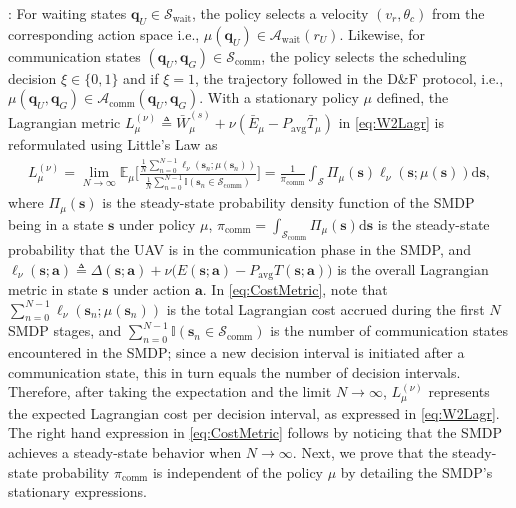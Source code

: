 \documentclass[12pt, draftcls, onecolumn]{IEEEtran}
\theoremstyle{plain}
\theoremstyle{definition}
\theoremstyle{remark}
\begin{document}
: For {waiting} states $\mathbf{q}_{U}{\in}\mathcal{S}_{\mathrm{wait}}$, the policy selects a velocity $(v_{r},\theta_{c})$ from the corresponding action space i.e., $\mu(\mathbf{q}_{U}){\in}\mathcal{A}_{\mathrm{wait}}(r_{U})$. Likewise, for {communication} states $(\mathbf{q}_{U},\mathbf{q}_{G}){\in}\mathcal{S}_{\mathrm{comm}}$, the policy selects the scheduling decision $\xi{\in}\{0,1\}$ and if $\xi{=}1$, the trajectory followed in the D\&F protocol, i.e., $\mu(\mathbf{q}_{U},\mathbf{q}_{G}){\in}\mathcal{A}_{\mathrm{comm}}(\mathbf{q}_{U},\mathbf{q}_{G})$. With a stationary policy $\mu$ defined, the Lagrangian metric $L_{\mu}^{(\nu)}{\triangleq}\bar{W}_{\mu}^{(s)}{+}\nu(\bar{E}_{\mu}{-}P_{\mathrm{avg}}\bar{T}_{\mu})$ in \eqref{eq:W2Lagr} is reformulated using Little's Law \cite{LittlesLaw} as
\begin{align}\label{eq:CostMetric}
    L_\mu^{(\nu)}
    = \lim_{N \rightarrow \infty} \mathbb{E}_\mu \Bigg[ \frac{\frac{1}{N}\sum_{n=0}^{N-1}  \ell_\nu(\mathbf{s}_n; \mu(\mathbf{s}_n)) }{\frac{1}{N}\sum_{n = 0}^{N-1} \mathbb I(\mathbf{s}_n \in \mathcal{S}_{\mathrm{comm}})}  \Bigg]
    = \frac{1}{\pi_{\mathrm{comm}}}\int_{\mathcal{S}} \Pi_{\mu}(\mathbf{s})\ell_\nu(\mathbf{s}; \mu(\mathbf{s}))\mathrm{d}\mathbf{s},
\end{align}
where $\Pi_{\mu}(\mathbf{s})$ is the steady-state probability density function of the SMDP being in a state $\mathbf{s}$ under policy $\mu$, $\pi_{\mathrm{comm}}{=}\int_{\mathcal{S}_{\mathrm{comm}}}\!\!\!\!\!\Pi_{\mu}(\mathbf{s})\mathrm{d}\mathbf{s}$ is the  steady-state probability that the UAV is in the communication phase in the SMDP, and $\ell_{\nu}(\mathbf{s};\mathbf{a}){\triangleq}\Delta(\mathbf{s};\mathbf{a}){+}\nu\big(E(\mathbf{s};\mathbf{a}){-}P_{\mathrm{avg}}T(\mathbf{s};\mathbf{a})\big)$ is the overall Lagrangian metric in state $\mathbf{s}$ under action $\mathbf{a}$.
In \eqref{eq:CostMetric}, note that $\sum_{n=0}^{N{-}1}\ell_{\nu}(\mathbf{s}_{n};\mu(\mathbf{s}_{n}))$ is the total Lagrangian cost accrued during the first $N$ SMDP stages, and $\sum_{n{=}0}^{N{-}1}\mathbb{I}(\mathbf{s}_{n}{\in}\mathcal{S}_{\mathrm{comm}})$ is the number of communication states encountered in the SMDP; since a new decision interval is initiated after a communication state, this in turn equals the number of decision intervals. Therefore, after taking the expectation and the limit $N{\to}\infty$, $L_{\mu}^{(\nu)}$ represents the expected Lagrangian cost per decision interval, as expressed in \eqref{eq:W2Lagr}. The right hand expression in \eqref{eq:CostMetric} follows by noticing that the SMDP achieves a steady-state behavior when $N\to\infty$. Next, we prove that the steady-state probability $\pi_{\mathrm{comm}}$ is independent of the policy $\mu$ by detailing the SMDP's stationary expressions. 
\end{document}
